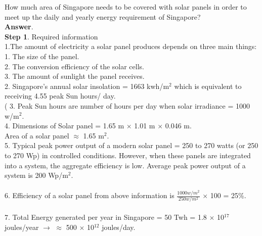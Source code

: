 \documentclass[11pt]{exam}
\begin{document}
\begin{questions}


\question
\label{Q25:Solar Panel Singapore}
How much area of Singapore needs to be covered with solar panels in order to meet up the daily and yearly energy requirement of Singapore? \\
\textbf{Answer}. \\
\textbf{Step 1}. Required information \\
                 1.The amount of electricity a solar panel produces depends on three main things: 1. The size of the panel. \\
        2. The conversion efficiency of the solar cells.\\
        3. The amount of sunlight the panel receives.\\
                 2. Singapore's annual solar insolation = 1663 kwh/m$^{2}$ which is equivalent to receiving 4.55 peak Sun hours/ day.\\ (%
                 3. Peak Sun hours are number of hours per day when solar irradiance = 1000 w/m$^{2}$.\\
                 4. Dimensions of Solar panel = 1.65 m $\times$ 1.01 m $\times$ 0.046 m.\\
                    Area of a solar panel $\approx$ 1.65 m$^{2}$. \\
                    
                 5. Typical peak power output of a modern solar panel = 250 to 270 watts (or 250 to 270 Wp) in controlled conditions. However, when these panels are integrated into a system, the aggregate efficiency is low. Average peak power output of a system is 200 Wp/m$^{2}$. \\ \\
                 6. Efficiency of a solar panel from above information is $\frac{1000 w/m^{2}}{250 w/m^{2}}$ $\times$ 100 = 25\%. \\ \\
                 
                 7. Total Energy generated per year in Singapore = 50 Twh = 1.8 $\times$ 10$^{17}$ joules/year $\rightarrow$ $\approx$ 500 $\times$ 10$^{12}$ joules/day.
                                 

\end{questions}
\end{document}
